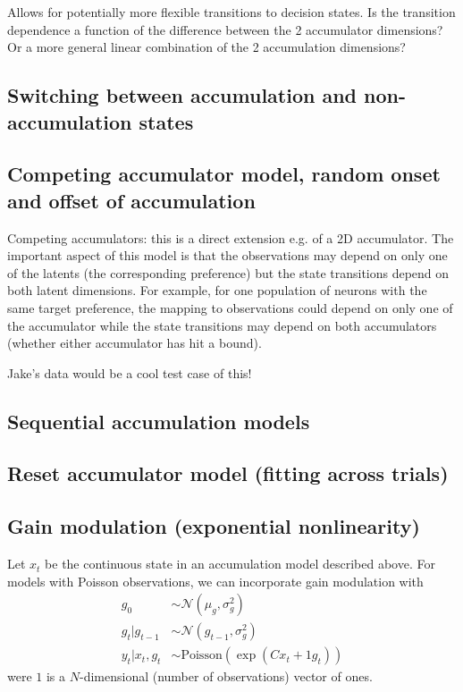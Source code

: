 \documentclass{article}
\begin{document}
Allows for potentially more flexible transitions to decision states. Is the transition dependence a function of the difference between the 2 accumulator dimensions? Or a more general linear combination of the 2 accumulation dimensions? 

\subsection{Switching between accumulation and non-accumulation states}


\subsection{Competing accumulator model, random onset and offset of accumulation}
Competing accumulators: this is a direct extension e.g. of a 2D accumulator. The important aspect of this model is that the observations may depend on only one of the latents (the corresponding preference) but the state transitions depend on both latent dimensions. For example, for one population of neurons with the same target preference, the mapping to observations could depend on only one of the accumulator while the state transitions may depend on both accumulators (whether either accumulator has hit a bound). 

Jake's data would be a cool test case of this!

\subsection{Sequential accumulation models}

\subsection{Reset accumulator model (fitting across trials)}

\subsection{Gain modulation (exponential nonlinearity)}
Let $x_t$ be the continuous state in an accumulation model described above. For models with Poisson observations, we can incorporate gain modulation \cite{goris2017dissociation} with
\begin{align}
g_0 & \sim \mathcal{N}(\mu_g, \sigma_g^2) \\
g_t | g_{t-1} & \sim \mathcal{N}(g_{t-1}, \sigma_g^2) \\
y_t | x_t, g_t & \sim \mathrm{Poisson}(\exp(C x_t + \mathrm{1} g_t))
\end{align}
were $\mathrm{1}$ is a $N$-dimensional (number of observations) vector of ones. 
\end{document}

